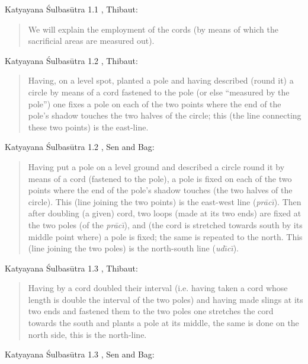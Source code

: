 \documentclass{article}
\begin{document}
Katyayana \'Sulbas\=utra 1.1 \cite[p.~95]{thibaut1882}, Thibaut:

\begin{quote}
We will explain the employment of the cords (by means of which the sacrificial areas are measured out).
\end{quote}

Katyayana \'Sulbas\=utra 1.2 \cite[p.~95]{thibaut1882}, Thibaut:

\begin{quote}
Having, on a level spot, planted a pole and having described (round it) a circle by means of a cord fastened to the pole (or else ``measured by the pole'')
one fixes a pole on each of the two points where the end of the pole's shadow touches the two halves of the circle; this (the line connecting these two points) is the east-line.
\end{quote}

Katyayana \'Sulbas\=utra 1.2 \cite[p.~120]{senbag}, Sen and Bag:

\begin{quote}
Having put a pole on a level ground and described a circle round it by means
of a cord (fastened to the pole), a pole is fixed on each of the two points where
the end of the pole's shadow touches (the two halves of the circle). This (line
joining the two points) is the east-west line ({\em pr\=ac\=\i}). Then after doubling (a
given) cord, two loops (made at its two ends) are fixed at the two poles (of
the {\em pr\=ac\=\i}), and (the cord is stretched towards south by its middle point where)
a pole is fixed; the same is repeated to the north. This (line joining the two 
poles) is the north-south line ({\em ud{\=\i}c{\=\i}}). 
\end{quote}

Katyayana \'Sulbas\=utra 1.3 \cite[p.~99]{thibaut1882}, Thibaut:

\begin{quote}
Having by a cord doubled their interval (i.e. having taken a cord whose length is double the interval of the two poles)
and having made slings at its two ends and fastened them to the two poles one stretches the cord towards the south
and plants a pole at its middle, the same is done on the north side, this is the north-line.
\end{quote}

Katyayana \'Sulbas\=utra 1.3 \cite[p.~120]{senbag}, Sen and Bag:
\end{document}

